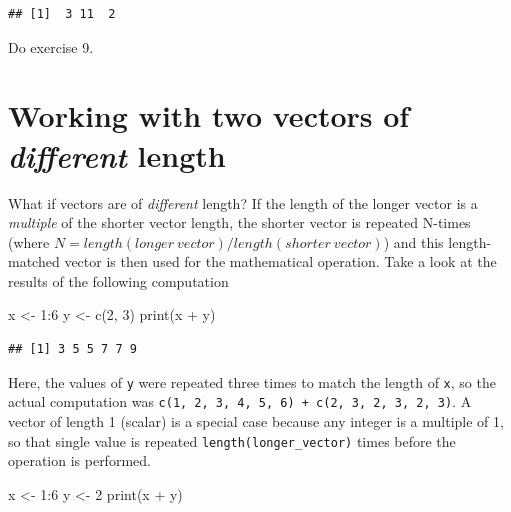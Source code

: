 \documentclass[
]{book}
\newenvironment{Shaded}{\begin{snugshade}}{\end{snugshade}}
\newcommand{\DecValTok}[1]{\textcolor[rgb]{0.00,0.00,0.81}{#1}}
\newcommand{\FunctionTok}[1]{\textcolor[rgb]{0.00,0.00,0.00}{#1}}
\newcommand{\NormalTok}[1]{#1}
\newcommand{\OtherTok}[1]{\textcolor[rgb]{0.56,0.35,0.01}{#1}}
\newcommand{\SpecialCharTok}[1]{\textcolor[rgb]{0.00,0.00,0.00}{#1}}
\begin{document}
\begin{verbatim}
## [1]  3 11  2
\end{verbatim}

Do exercise 9.

\hypertarget{different-length-vectors}{%
\section{\texorpdfstring{Working with two vectors of \emph{different} length}{Working with two vectors of different length}}\label{different-length-vectors}}

What if vectors are of \emph{different} length? If the length of the longer vector is a \emph{multiple} of the shorter vector length, the shorter vector is repeated N-times (where \(N = length(longer~vector) / length(shorter~vector)\)) and this length-matched vector is then used for the mathematical operation. Take a look at the results of the following computation

\begin{Shaded}
\begin{Highlighting}[]
\NormalTok{x }\OtherTok{\textless{}{-}} \DecValTok{1}\SpecialCharTok{:}\DecValTok{6}
\NormalTok{y }\OtherTok{\textless{}{-}} \FunctionTok{c}\NormalTok{(}\DecValTok{2}\NormalTok{, }\DecValTok{3}\NormalTok{)}
\FunctionTok{print}\NormalTok{(x }\SpecialCharTok{+}\NormalTok{ y)}
\end{Highlighting}
\end{Shaded}

\begin{verbatim}
## [1] 3 5 5 7 7 9
\end{verbatim}

Here, the values of \texttt{y} were repeated three times to match the length of \texttt{x}, so the actual computation was \texttt{c(1,\ 2,\ 3,\ 4,\ 5,\ 6)\ +\ c(2,\ 3,\ 2,\ 3,\ 2,\ 3)}. A vector of length 1 (scalar) is a special case because any integer is a multiple of 1, so that single value is repeated \texttt{length(longer\_vector)} times before the operation is performed.

\begin{Shaded}
\begin{Highlighting}[]
\NormalTok{x }\OtherTok{\textless{}{-}} \DecValTok{1}\SpecialCharTok{:}\DecValTok{6}
\NormalTok{y }\OtherTok{\textless{}{-}} \DecValTok{2}
\FunctionTok{print}\NormalTok{(x }\SpecialCharTok{+}\NormalTok{ y)}
\end{Highlighting}
\end{Shaded}
\end{document}
